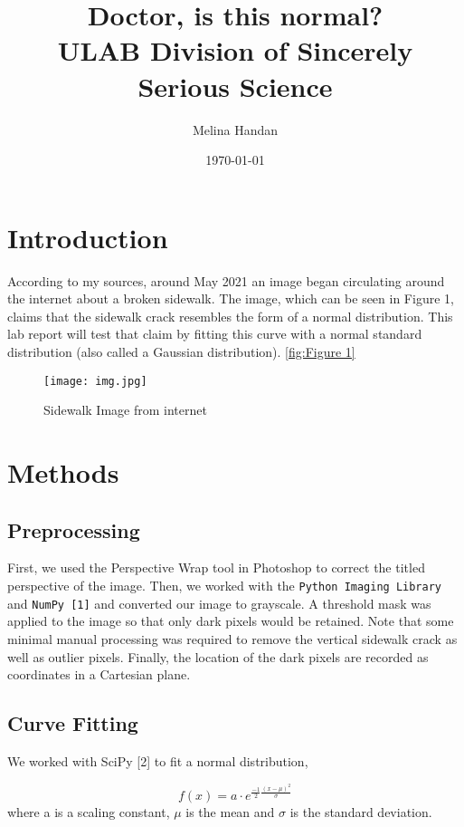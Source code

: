 \documentclass{article}
\title{%
 Doctor, is this normal? \\
  \large ULAB Division of Sincerely Serious Science}
\author{Melina Handan}
\date\today
\begin{document}
\maketitle

\section{Introduction}
According to my sources, around May 2021 an image began circulating around the internet about a broken sidewalk. The image, which can be seen in Figure 1, claims that the sidewalk crack resembles the form of a normal distribution. This lab report will test that claim by fitting this curve with a normal standard distribution (also called a Gaussian distribution). \autoref{fig:Figure 1}

\begin{figure} [h]
    \centering
    \texttt{[image: img.jpg]}
    \caption{Sidewalk Image from internet}
    \label{fig:Figure 1}
\end{figure}


\section{Methods}
\subsection{Preprocessing}
First, we used the Perspective Wrap tool in Photoshop to correct the titled perspective of the image. Then, we worked with the \texttt{Python Imaging Library} and \texttt{NumPy [1]} and converted our image to grayscale. A threshold mask was applied to the image so that only dark pixels would be retained. Note that some minimal manual processing was required to remove the vertical sidewalk crack as well as outlier pixels. Finally, the location of the dark pixels are recorded as coordinates in a Cartesian plane.

\subsection{Curve Fitting}
We worked with SciPy [2] to fit a normal distribution,

\begin{equation}
    f(x) = a \cdot e^{\frac{-1}{2}\frac{(x-\mu)^2}{\sigma}}
\end{equation}
where a is a scaling constant, $\mu$ is the mean and $\sigma$ is the standard deviation.
\end{document}
